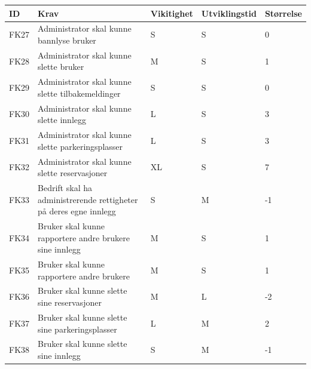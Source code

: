 \documentclass[12pt]{article}
\newcommand{\cello}{\cellcolor{orange!25}}
\newcommand{\celly}{\cellcolor{yellow!25}}
\newcommand{\celll}{\cellcolor{lime!25}}
\newcommand{\cellg}{\cellcolor{green!25}}
\begin{document}
        \begin{tabular}{|p{2cm}|p{6cm}|
            >{\centering\arraybackslash}p{2cm}|
            >{\centering\arraybackslash}p{2cm}|
            >{\centering\arraybackslash}p{2cm}|} 
            \hline
            \bf ID & \bf Krav & \bf Vikitighet & \bf Utviklingstid & \bf Størrelse\\
            \hline
            FK27
            &
            Administrator skal kunne bannlyse bruker
            & S & S & \celly 0\\
            \hline
            FK28
            &
            Administrator skal kunne slette bruker
            & M & S & \celll 1\\
            \hline
            FK29
            &
            Administrator skal kunne slette tilbakemeldinger
            & S & S & \celly 0\\
            \hline
            FK30
            &
            Administrator skal kunne slette innlegg
            & L & S & \cellg 3\\
            \hline
            FK31
            &
            Administrator skal kunne slette parkeringsplasser
            & L & S & \cellg 3\\
            \hline
            FK32
            &
            Administrator skal kunne slette reservasjoner
            & XL & S & \cellg 7\\
            \hline
            FK33
            &
            Bedrift skal ha administrerende rettigheter på deres egne innlegg
            & S & M & \cello -1\\
            \hline
            FK34
            &
            Bruker skal kunne rapportere andre brukere sine innlegg
            & M & S & \celll 1\\
            \hline
            FK35
            &
            Bruker skal kunne rapportere andre brukere
            & M & S & \celll 1\\
            \hline
            FK36
            &
            Bruker skal kunne slette sine reservasjoner
            & M & L & \cello -2\\
            \hline
            FK37
            &
            Bruker skal kunne slette sine parkeringsplasser
            & L & M & \cellg 2\\
            \hline
            FK38
            &
            Bruker skal kunne slette sine innlegg
            & S & M & \cello -1 \\
            \hline
        \end{tabular}
        
\end{document}
